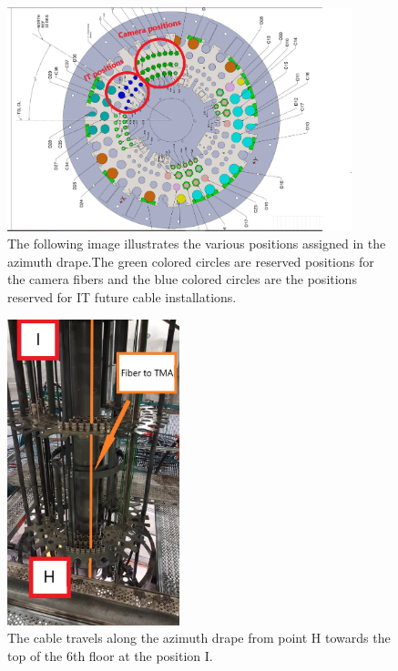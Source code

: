   \begin{figure}
    \centering
    \includegraphics[width=10cm]{images/22.png}
    \caption*{The following image illustrates the various positions assigned in the azimuth drape.The green colored circles are reserved positions for the camera fibers and the blue colored circles are the positions reserved for IT future cable installations.}
  \end{figure}
  \begin{figure}
    \centering
    \includegraphics[width=5cm]{images/22-1.jpg}
    \caption*{The cable travels along the azimuth drape from point H towards the top of the 6th floor at the position I.}
  \end{figure}

\newpage

